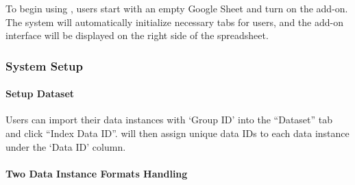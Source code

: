 
To begin using \system, users start with an empty Google Sheet and turn on the add-on. The system will automatically initialize necessary tabs for users, and the add-on interface will be displayed on the right side of the spreadsheet. 

\subsubsection{System Setup}



\paragraph{Setup Dataset} 
Users can import their data instances with `Group ID' into the ``Dataset'' tab and click ``Index Data ID''. \system will then assign unique data IDs to each data instance under the `Data ID' column.

\paragraph{Two Data Instance Formats Handling}



